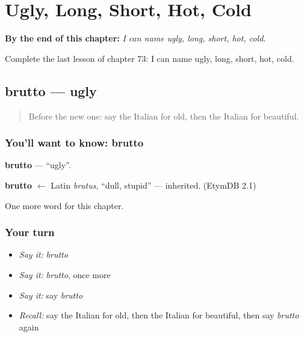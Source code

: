 
\chapter{Ugly, Long, Short, Hot, Cold}
\label{ch:it-ugly-long-short-hot-cold}

\begin{chapteropening}
\textbf{By the end of this chapter:} \emph{I can name ugly, long, short, hot, cold.}

Complete the last lesson of chapter 73: I can name ugly, long, short, hot, cold.
\end{chapteropening}

\section[brutto]{brutto — ugly}

\label{lesson:IT-C73-brutto}



\begin{quote}
Before the new one: say the Italian for old, then the Italian for beautiful.
\end{quote}

\subsection*{You'll want to know: brutto}
\textbf{brutto} — \textquotedblleft{}ugly\textquotedblright{}.

\begin{cousinweb}
\textbf{brutto} $\leftarrow$ Latin \emph{brutus}, \textquotedblleft{}dull, stupid\textquotedblright{} — inherited. (EtymDB 2.1)
\end{cousinweb}

\begin{grammarlens}[title={What you've built}]
One more word for this chapter.
\end{grammarlens}

\subsection*{Your turn}
\begin{itemize}
\raggedright
  \item \emph{Say it:} \emph{brutto}
  \item \emph{Say it:} \emph{brutto}, once more
  \item \emph{Say it:} say \emph{brutto}
  \item \emph{Recall:} say the Italian for old, then the Italian for beautiful, then say \emph{brutto} again
\end{itemize}

